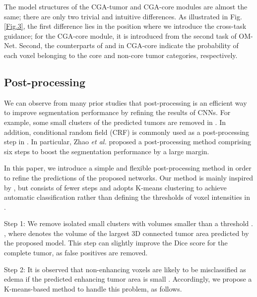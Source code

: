 \documentclass[journal,twoside]{IEEEtran}
\begin{document}
The model structures of the CGA-tumor and CGA-core modules are almost the same; there are only two trivial and intuitive differences. As illustrated in Fig. \ref{Fig.3}, the first difference lies in the position where we introduce the cross-task guidance; for the CGA-core module, it is introduced from the second task of OM-Net. Second, the counterparts of  and  in CGA-core indicate the probability of each voxel belonging to the core and non-core tumor categories, respectively. 





\subsection{Post-processing}
We can observe from many prior studies \cite{pereira2016brain,kamnitsas2017efficient,havaei2017brain,zhao2018deep,kamnitsas2017ensembles,isensee2018no,chen2018focus} that post-processing is an efficient way to improve segmentation performance by refining the results of CNNs. For example, some small clusters of the predicted tumors are removed in \cite{pereira2016brain,kamnitsas2017ensembles,isensee2018no,chen2018focus}. In addition, conditional random field (CRF) is commonly used as a post-processing step in \cite{kamnitsas2017efficient,havaei2017brain}. In particular, Zhao \emph{et al.} \cite{zhao2018deep} proposed a post-processing method comprising six steps to boost the segmentation performance by a large margin.



In this paper, we introduce a simple and flexible post-processing method in order to refine the predictions of the proposed networks. Our method is mainly inspired by \cite{zhao2018deep}, but consists of fewer steps and adopts K-means clustering to achieve automatic classification rather than defining the thresholds of voxel intensities in \cite{zhao2018deep}. 
	
	


Step 1:  We remove isolated small clusters with volumes smaller than a threshold . , where  denotes the volume of the largest 3D connected tumor area predicted by the proposed model. This step can slightly improve the Dice score for the complete tumor, as false positives are removed.


Step 2: It is observed that non-enhancing voxels are likely to be misclassified as edema if the predicted enhancing tumor area is small \cite{zhao2018deep}. Accordingly, we propose a K-means-based method to handle this problem, as follows.
\end{document}
